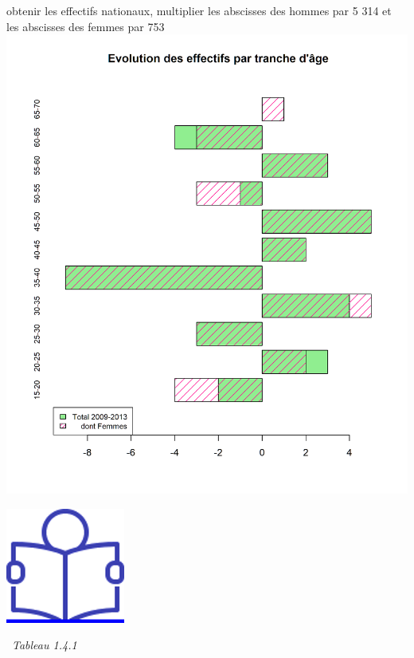 obtenir les effectifs nationaux, multiplier les abscisses des hommes par
5 314 et les abscisses des femmes par 753\newpage
\includegraphics{altair_files/figure-latex/unnamed-chunk-23-3.png}

\href{../Docs/Notices/fiche_3.odt}{\includegraphics{icones/Notice.png}}

\newpage

~\emph{Tableau 1.4.1}

